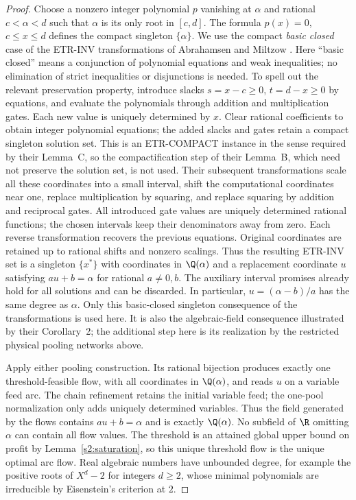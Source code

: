 \begin{proof}
Choose a nonzero integer polynomial $p$ vanishing at $\alpha$ and
rational $c<\alpha<d$ such that $\alpha$ is its only root in $[c,d]$.
The formula $p(x)=0$, $c\le x\le d$ defines the compact singleton
$\{\alpha\}$. We use the compact \emph{basic closed} case of the
ETR-INV transformations of Abrahamsen and Miltzow
\citep[Lemmas~C--G, underlying Theorem~1]{abrahamsen2019-dynamic-toolbox-for-etrinv}.
Here ``basic closed'' means a conjunction of polynomial equations and
weak inequalities; no elimination of strict inequalities or disjunctions
is needed. To spell out the relevant preservation property, introduce
slacks $s=x-c\ge0$, $t=d-x\ge0$ by equations, and evaluate the
polynomials through addition and multiplication gates. Each new value
is uniquely determined by $x$. Clear rational coefficients to obtain
integer polynomial equations; the added slacks and gates retain a
compact singleton solution set. This is an ETR-COMPACT instance in the
sense required by their Lemma~C, so the compactification step of their
Lemma~B, which need not preserve the solution set, is not used.
Their subsequent transformations scale all these coordinates into a
small interval, shift the computational coordinates near one, replace
multiplication by squaring, and replace squaring by addition and
reciprocal gates. All introduced gate values are uniquely determined
rational functions; the chosen intervals keep their denominators away
from zero. Each reverse transformation recovers the previous equations.
Original coordinates are retained up to rational shifts and nonzero
scalings. Thus the resulting \textsc{ETR-INV} set is a singleton
$\{x^*\}$ with coordinates in $\Q(\alpha)$ and a replacement
coordinate $u$ satisfying $au+b=\alpha$ for rational $a\ne0,b$.
The auxiliary interval promises already hold for all solutions and can
be discarded. In particular, $u=(\alpha-b)/a$ has the same degree as
$\alpha$. Only this basic-closed singleton consequence of the
transformations is used here. It is also the algebraic-field consequence
illustrated by their Corollary~2; the additional step here is its
realization by the restricted physical pooling networks above.

Apply either pooling construction. Its rational bijection produces
exactly one threshold-feasible flow, with all coordinates in
$\Q(\alpha)$, and reads $u$ on a variable feed arc. The chain
refinement retains the initial variable feed; the one-pool
normalization only adds uniquely determined variables. Thus the field
generated by the flows contains $au+b=\alpha$ and is exactly
$\Q(\alpha)$. No subfield of $\R$ omitting $\alpha$ can contain all
flow values. The threshold is an attained global upper bound on profit
by Lemma~\ref{s2:saturation}, so this unique threshold flow is the
unique optimal arc flow. Real algebraic numbers have unbounded degree,
for example the positive roots of $X^d-2$ for integers $d\ge2$, whose
minimal polynomials are irreducible by Eisenstein's criterion at $2$.
\end{proof}

